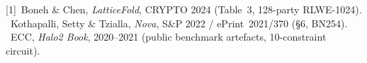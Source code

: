 \documentclass[10pt]{article}
\begin{document}
\begin{table}[ht]
\medskip
\noindent\footnotesize
[1]~Boneh \& Chen, \textit{LatticeFold}, CRYPTO 2024 (Table~3, 128-party RLWE-1024).\\
[2]~Kothapalli, Setty \& Tzialla, \textit{Nova}, S\&P 2022 / ePrint~2021/370 (\S6, BN254).\\
[3]~ECC, \textit{Halo2 Book}, 2020--2021 (public benchmark artefacts, 10-constraint circuit).
\end{table}
\end{document}
